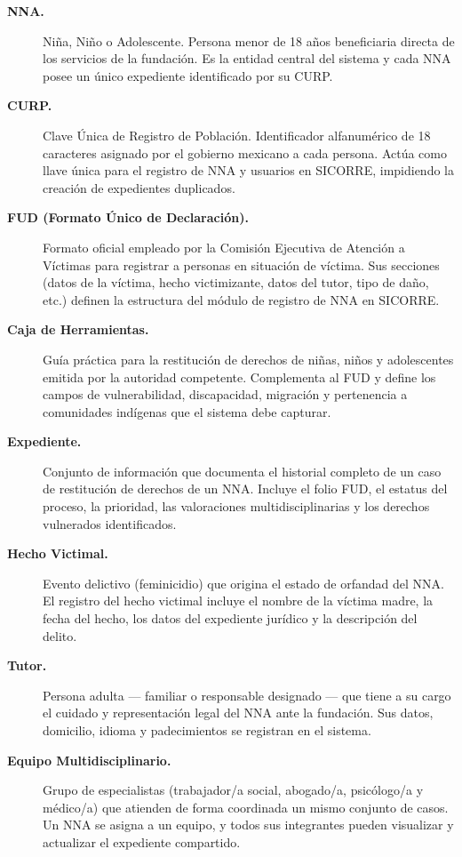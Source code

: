 \begin{description}
	\item[\textbf{NNA.}]
	Niña, Niño o Adolescente. Persona menor de 18 años beneficiaria
	directa de los servicios de la fundación. Es la entidad central del
	sistema y cada NNA posee un único expediente identificado por su
	CURP.
	
	\item[\textbf{CURP.}]
	Clave Única de Registro de Población. Identificador alfanumérico
	de 18 caracteres asignado por el gobierno mexicano a cada persona.
	Actúa como llave única para el registro de NNA y usuarios en
	SICORRE, impidiendo la creación de expedientes duplicados.
	
	\item[\textbf{FUD (Formato Único de Declaración).}]
	Formato oficial empleado por la Comisión Ejecutiva de Atención a
	Víctimas para registrar a personas en situación de víctima. Sus
	secciones (datos de la víctima, hecho victimizante, datos del tutor,
	tipo de daño, etc.) definen la estructura del módulo de registro de
	NNA en SICORRE.
	
	\item[\textbf{Caja de Herramientas.}]
	Guía práctica para la restitución de derechos de niñas, niños y
	adolescentes emitida por la autoridad competente. Complementa al
	FUD y define los campos de vulnerabilidad, discapacidad, migración y
	pertenencia a comunidades indígenas que el sistema debe capturar.
	
	\item[\textbf{Expediente.}]
	Conjunto de información que documenta el historial completo de un
	caso de restitución de derechos de un NNA. Incluye el folio FUD,
	el estatus del proceso, la prioridad, las valoraciones
	multidisciplinarias y los derechos vulnerados identificados.
	
	\item[\textbf{Hecho Victimal.}]
	Evento delictivo (feminicidio) que origina el estado de orfandad
	del NNA. El registro del hecho victimal incluye el nombre de la
	víctima madre, la fecha del hecho, los datos del expediente jurídico
	y la descripción del delito.
	
	\item[\textbf{Tutor.}]
	Persona adulta — familiar o responsable designado — que tiene a su
	cargo el cuidado y representación legal del NNA ante la fundación.
	Sus datos, domicilio, idioma y padecimientos se registran en el
	sistema.
	
	\item[\textbf{Equipo Multidisciplinario.}]
	Grupo de especialistas (trabajador/a social, abogado/a, psicólogo/a
	y médico/a) que atienden de forma coordinada un mismo conjunto de
	casos. Un NNA se asigna a un equipo, y todos sus integrantes pueden
	visualizar y actualizar el expediente compartido.
	

\end{description}
